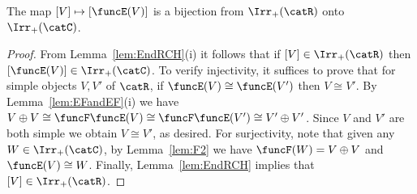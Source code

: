 \documentclass[12pt]{amsart}
\begin{document}
\begin{prp}
\label{prp:IrrI-IrrII}
The map $[V]\mapsto [\funcE(V)]$ is a bijection from $\Irr_+(\catR)$ onto $\Irr_+(\catC)$.

\end{prp}


\begin{proof}
From Lemma~\ref{lem:EndRCH}(i)
it follows that 
if 
$[V]\in\Irr_+(\catR)$ then
$[\funcE(V)]\in \Irr_+(\catC)$.
To verify injectivity, it suffices to prove that for simple objects $V,V'$ of $\catR$, if $\funcE(V)\cong \funcE(V')$ then $V\cong V'$.
By Lemma~\ref{lem:EFandEF}(i) 
we have $V\oplus V\cong \funcF\funcE(V)\cong \funcF\funcE(V')\cong V'\oplus V'$. Since $V$ and $V'$ are both simple we obtain $V\cong V'$, as desired.
For surjectivity,  note that given any $W\in\Irr_+(\catC)$, by Lemma~\ref{lem:F2} we have  
$\funcF(W)=V\oplus V$ and $\funcE(V)\cong W$. Finally, Lemma~\ref{lem:EndRCH} implies that $[V]\in\Irr_+(\catR)$.     
\end{proof}
\end{document}

